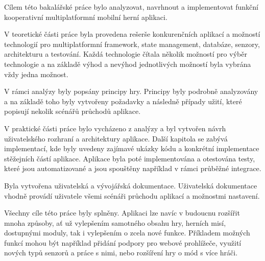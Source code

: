 \begin{conclusion}
Cílem této bakalářské práce bylo analyzovat, navrhnout a implementovat
funkční kooperativní multiplatformní mobilní herní aplikaci. 

V teoretické části práce byla provedena rešerše konkurenčních aplikací
a možností technologií pro multiplatformní framework, state management,
databáze, senzory, architekturu a testování.
Každá technologie čítala několik možností pro výběr technologie
a na základě výhod a nevýhod jednotlivých možností byla vybrána vždy
jedna možnost.

V rámci analýzy byly popsány principy hry.
Principy byly podrobně analyzovány a na základě toho byly vytvořeny
požadavky a následně případy užití,
které popisují nekolik scénářů průchodů aplikace.

V praktické části práce bylo vycházeno z analýzy
a byl vytvořen návrh uživatelského rozhraní
a architektury aplikace.
Další kapitola se zabývá implementací,
kde byly uvedeny zajímavé ukázky kódu
a konkrétní implementace stěžejních částí aplikace.
Aplikace byla poté implementována a otestována testy,
které jsou automatizované a jsou spouštěny například v rámci průběžné integrace.

Byla vytvořena uživatelská a vývojářská dokumentace.
Uživatelská dokumentace vhodně provádí uživatele všemi scénáři průchodu
aplikací a možnostmi nastavení. 

Všechny cíle této práce byly splněny.
Aplikaci lze navíc v budoucnu rozšířit mnoha způsoby,
ať už vylepšením samotného obsahu hry, herních misí, dostupnými moduly,
tak i vylepšením o zcela nové funkce.
Příkladem možných funkcí mohou být například
přidání podpory pro webové prohlížeče,
využití nových typů senzorů a práce s nimi,
nebo rozšíření hry o mód s více hráči.
\end{conclusion}
